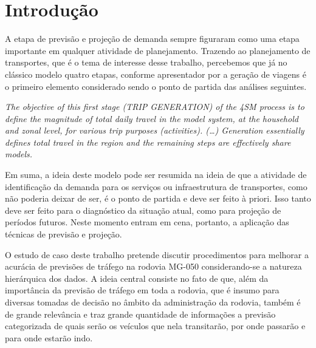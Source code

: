 \documentclass[
	12pt,				%
	openright,			%
	twoside,			%
	a4paper,			%
	english,			%
	french,				%
	spanish,			%
	brazil				%
	]{abntex2}
\begin{document}
\tableofcontents*
\cleardoublepage



\textual

\chapter*[Introdução]{Introdução}

A etapa de previsão e projeção de demanda sempre figuraram como uma etapa importante em qualquer atividade de planejamento.
Trazendo ao planejamento de transportes, que é o tema de interesse desse trabalho, percebemos que já no clássico modelo quatro etapas, conforme apresentador por  a geração de viagens é o primeiro elemento considerado sendo o ponto de partida das análises seguintes.

\begin{citacao}
\emph{The objective of this first stage (TRIP GENERATION) of the 4SM process is to define the magnitude of total daily travel in the model system, at the household and zonal level, for various trip purposes (activities). (…) Generation essentially defines total travel in the region and the remaining steps are effectively share models.} \cite{hensher_handbook_2007}
\end{citacao}
 
Em suma, a ideia deste modelo pode ser resumida na ideia de que a atividade de identificação da demanda para os serviços ou infraestrutura de transportes, como não poderia deixar de ser, é o ponto de partida e deve ser feito à priori. Isso tanto deve ser feito para o diagnóstico da situação atual, como para projeção de períodos futuros. Neste momento entram em cena, portanto, a aplicação das técnicas de previsão e projeção.

O estudo de caso deste trabalho pretende discutir procedimentos para melhorar a acurácia de previsões de tráfego na rodovia MG-050 considerando-se a natureza hierárquica dos dados. A ideia central consiste no fato de que, além da importância da previsão de tráfego em toda a rodovia, que é insumo para diversas tomadas de decisão no âmbito da administração da rodovia, também é de grande relevância e traz grande quantidade de informações a previsão categorizada de quais serão os veículos que nela transitarão, por onde passarão e para onde estarão indo.
\end{document}
